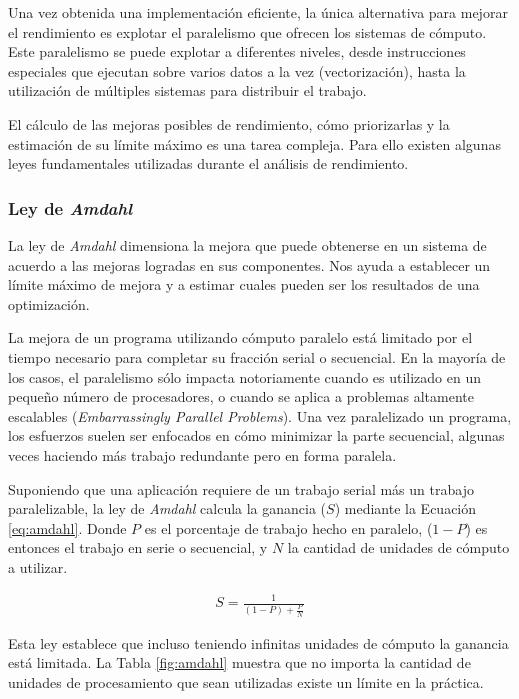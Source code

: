 \documentclass[a4paper]{report}
\begin{document}
Una vez obtenida una implementación eficiente, la única alternativa para mejorar el rendimiento es explotar el paralelismo que
ofrecen los sistemas de cómputo. Este paralelismo se puede explotar a diferentes niveles, desde instrucciones especiales que ejecutan sobre varios
datos a la vez (vectorización), hasta la utilización de múltiples sistemas para distribuir el trabajo.

\bigskip

 El cálculo de las mejoras posibles de rendimiento, cómo priorizarlas y la estimación de su límite máximo es una tarea compleja. Para ello existen algunas leyes fundamentales utilizadas durante el análisis de rendimiento.

\subsubsection{Ley de {\it Amdahl}}

 La ley de {\it Amdahl} \cite{amdahl} dimensiona la mejora que puede obtenerse en un sistema de acuerdo a las mejoras logradas en sus componentes. Nos ayuda a establecer un límite máximo de mejora y a estimar cuales pueden ser los resultados de una optimización.

\bigskip

La mejora de un programa utilizando cómputo paralelo está limitado por el tiempo necesario para completar su fracción serial o secuencial. En la mayoría de los casos, el paralelismo sólo impacta notoriamente cuando es utilizado en un pequeño número de procesadores, o cuando se aplica a problemas altamente escalables ({\it Embarrassingly Parallel Problems}). Una vez paralelizado un programa, los esfuerzos suelen ser enfocados en cómo minimizar la parte secuencial, algunas veces haciendo más trabajo redundante pero en forma paralela.

\bigskip

Suponiendo que una aplicación requiere de un trabajo serial más un trabajo paralelizable, la ley de {\it Amdahl} calcula la ganancia ($ S $) mediante la Ecuación \ref{eq:amdahl}.
Donde $ P $ es el porcentaje de trabajo hecho en paralelo, ($ 1-P $) es entonces el trabajo en serie o secuencial, y $ N $ la cantidad de unidades de cómputo a utilizar.

\begin{eqnarray}
\label{eq:amdahl}
S = \frac{1}{(1 - P) + \frac{P}{N}}
\end{eqnarray}

Esta ley establece que incluso teniendo infinitas unidades de cómputo la ganancia está limitada.
La Tabla \ref{fig:amdahl} muestra que no importa la cantidad de unidades de
procesamiento que sean utilizadas existe un límite en la práctica.
\end{document}
